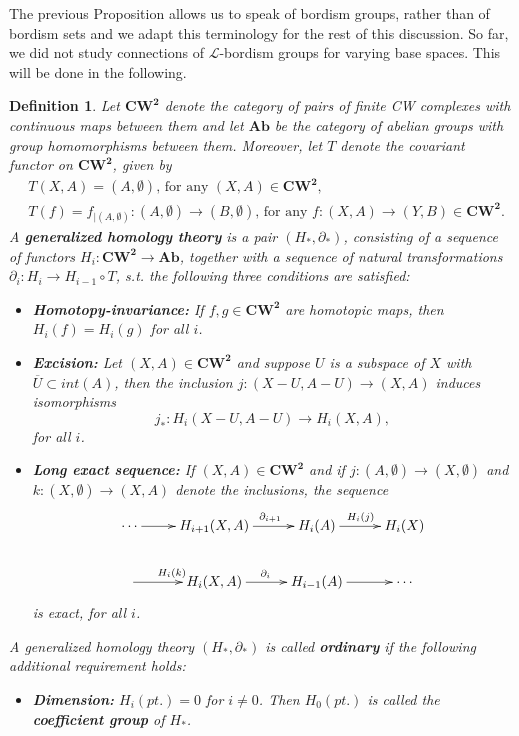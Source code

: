 \documentclass{scrreprt}
\newtheorem{definition}[prop]{Definition}
\begin{document}
The previous Proposition allows us to speak of bordism groups, rather than of bordism sets and we adapt this terminology for the rest of this discussion. \newline So far, we did not study connections of $\mathcal{L}$-bordism groups for varying base spaces. This will be done in the following.

\begin{definition}
Let $\boldsymbol{CW^2}$ denote the category of pairs of finite CW complexes with continuous maps between them and let $\boldsymbol{Ab}$ be the category of abelian groups with group homomorphisms between them. Moreover, let $T$ denote the covariant functor on $\boldsymbol{CW^2}$, given by
\begin{align*}
&T(X,A) = (A, \emptyset) \text{, for any } (X,A) \in \boldsymbol{CW^2},  \\
&T(f) = f_{|(A, \emptyset)} : (A, \emptyset) \to (B, \emptyset) \text{, for any } f: (X,A) \to (Y,B) \in \boldsymbol{CW^2}.
\end{align*}
A \textbf{generalized homology theory} is a pair $(H_*, \partial_*)$, consisting of a sequence of functors $H_i : \boldsymbol{CW^2} \to \boldsymbol{Ab}$, together with a sequence of natural transformations \\ $\partial_i : H_i \to H_{i-1} \circ T$, s.t. the following three conditions are satisfied: \begin{itemize}
\item[1.] \textbf{Homotopy-invariance:} If $f,g \in \boldsymbol{CW^2}$ are homotopic maps, then $H_i(f)=H_i(g)$ for all $i$.
\item[2.] \textbf{Excision:} Let $(X,A) \in \boldsymbol{CW^2}$ and suppose $U$ is a subspace of $X$ with $\overline{U} \subset int(A)$, then the inclusion $j: (X-U,A-U) \to (X,A)$ induces isomorphisms 
\begin{equation*}
j_* : H_i(X-U,A-U) \to H_i(X,A),
\end{equation*}
for all $i$.
\item[3.] \textbf{Long exact sequence:} If $(X,A) \in \boldsymbol{CW^2}$ and if $j: (A, \emptyset) \to (X, \emptyset)$ and $k: (X, \emptyset) \to (X,A)$ denote the inclusions, the sequence
\begin{equation*}
\begin{xy}
\xymatrix{ 
\cdots \ar[r]^{}     &   H_{i+1}(X,A) \ar[r]^{\ \ \partial_{i+1}}    &   H_i(A) \ar[r]^{H_i(j)}   &  H_i(X) \\
  \ar[r]^{H_i(k)}   &   H_i(X,A)  \ar[r]^{\partial_i}   &   H_{i-1}(A) \ar[r]^{}   &   \cdots
}
\end{xy}
\end{equation*}
is exact, for all $i$.
\end{itemize}
A generalized homology theory $(H_*, \partial_*)$ is called \textbf{ordinary} if the following additional requirement holds:
\begin{itemize}
\item[4.] \textbf{Dimension:} $H_i(pt.)=0$ for $i \neq 0$. Then $H_0(pt.)$ is called the \textbf{coefficient group} of $H_*$.
\end{itemize}
\end{definition}
\end{document}
